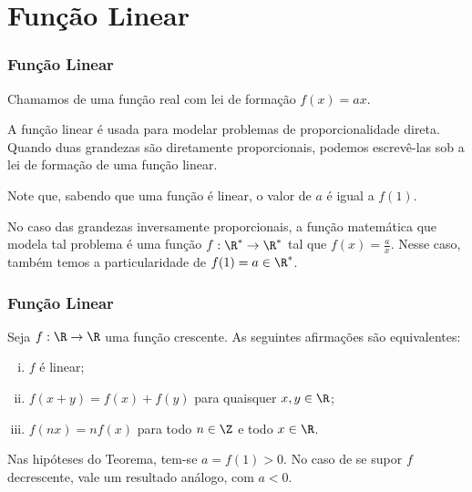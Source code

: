 \documentclass[brazil, notheorems, 10pt]{beamer}
\begin{document}

\section{Função Linear}
\begin{frame} \frametitle{Função Linear}
\begin{Def}
Chamamos de  uma função real com lei de formação
$f(x) = ax$.
\end{Def}\pause

A função linear é usada para modelar problemas de proporcionalidade
direta. Quando duas grandezas são diretamente proporcionais, podemos
escrevê-las sob a lei de formação de uma função linear.

Note que, sabendo que uma função é linear, o valor de $a$ é igual a
$f(1)$.\pause

No caso das grandezas inversamente proporcionais, a função
matemática que modela tal problema é uma função $f: \R^{\ast} \to
\R^{\ast}$ tal que $f(x) = \frac a x$. Nesse caso, também temos a
particularidade de $f(1) = a \in \R^{\ast}$.



\end{frame}


\begin{frame}
\frametitle{Função Linear} %

\begin{Teo}
Seja $f: \R \to \R$ uma função crescente. As seguintes afirmações
são equivalentes:
\begin{enumerate}[(i)]
	\item  $f$ é linear;
	\item $f(x+y) = f(x) + f(y)$ para quaisquer $x, y \in \R$;
	\item $f(nx) = nf(x)$ para todo $n \in \Z$ e todo $x \in \R$.
\end{enumerate}
\end{Teo}
Nas hipóteses do Teorema, tem-se $a=f(1) > 0$. No caso de se supor
$f$ decrescente, vale um resultado análogo, com $a<0$.

\end{frame}

\end{document}
